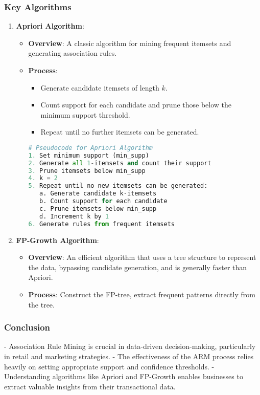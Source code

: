 \documentclass[aspectratio=169]{beamer}
\begin{document}
\begin{frame}[fragile]
    \frametitle{Key Algorithms}
    \begin{enumerate}
        \item \textbf{Apriori Algorithm}:
        \begin{itemize}
            \item \textbf{Overview}: A classic algorithm for mining frequent itemsets and generating association rules.
            \item \textbf{Process}:
            \begin{itemize}
                \item Generate candidate itemsets of length $k$.
                \item Count support for each candidate and prune those below the minimum support threshold.
                \item Repeat until no further itemsets can be generated.
            \end{itemize}
            \begin{lstlisting}[language=Python]
# Pseudocode for Apriori Algorithm
1. Set minimum support (min_supp)
2. Generate all 1-itemsets and count their support
3. Prune itemsets below min_supp
4. k = 2
5. Repeat until no new itemsets can be generated:
   a. Generate candidate k-itemsets
   b. Count support for each candidate
   c. Prune itemsets below min_supp
   d. Increment k by 1
6. Generate rules from frequent itemsets
            \end{lstlisting}
        \end{itemize}
        \item \textbf{FP-Growth Algorithm}:
        \begin{itemize}
            \item \textbf{Overview}: An efficient algorithm that uses a tree structure to represent the data, bypassing candidate generation, and is generally faster than Apriori.
            \item \textbf{Process}: Construct the FP-tree, extract frequent patterns directly from the tree.
        \end{itemize}
    \end{enumerate}
\end{frame}

\begin{frame}[fragile]
    \frametitle{Conclusion}
    - Association Rule Mining is crucial in data-driven decision-making, particularly in retail and marketing strategies.
    - The effectiveness of the ARM process relies heavily on setting appropriate support and confidence thresholds.
    - Understanding algorithms like Apriori and FP-Growth enables businesses to extract valuable insights from their transactional data.
\end{frame}
\end{document}
